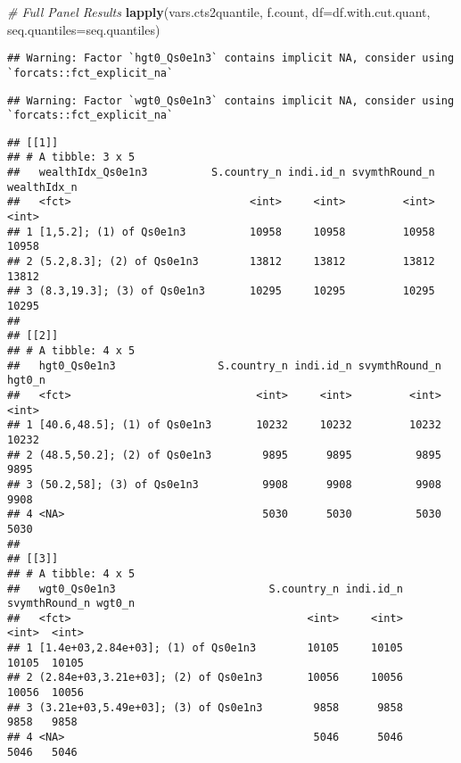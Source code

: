 \documentclass[
]{article}
\newenvironment{Shaded}{\begin{snugshade}}{\end{snugshade}}
\newcommand{\CommentTok}[1]{\textcolor[rgb]{0.56,0.35,0.01}{\textit{#1}}}
\newcommand{\DataTypeTok}[1]{\textcolor[rgb]{0.13,0.29,0.53}{#1}}
\newcommand{\KeywordTok}[1]{\textcolor[rgb]{0.13,0.29,0.53}{\textbf{#1}}}
\newcommand{\NormalTok}[1]{#1}
\begin{document}
\begin{Shaded}
\begin{Highlighting}[]
\CommentTok{# Full Panel Results}
\KeywordTok{lapply}\NormalTok{(vars.cts2quantile, f.count, }
       \DataTypeTok{df=}\NormalTok{df.with.cut.quant, }\DataTypeTok{seq.quantiles=}\NormalTok{seq.quantiles)}
\end{Highlighting}
\end{Shaded}

\begin{verbatim}
## Warning: Factor `hgt0_Qs0e1n3` contains implicit NA, consider using `forcats::fct_explicit_na`
\end{verbatim}

\begin{verbatim}
## Warning: Factor `wgt0_Qs0e1n3` contains implicit NA, consider using `forcats::fct_explicit_na`
\end{verbatim}

\begin{verbatim}
## [[1]]
## # A tibble: 3 x 5
##   wealthIdx_Qs0e1n3          S.country_n indi.id_n svymthRound_n wealthIdx_n
##   <fct>                            <int>     <int>         <int>       <int>
## 1 [1,5.2]; (1) of Qs0e1n3          10958     10958         10958       10958
## 2 (5.2,8.3]; (2) of Qs0e1n3        13812     13812         13812       13812
## 3 (8.3,19.3]; (3) of Qs0e1n3       10295     10295         10295       10295
## 
## [[2]]
## # A tibble: 4 x 5
##   hgt0_Qs0e1n3                S.country_n indi.id_n svymthRound_n hgt0_n
##   <fct>                             <int>     <int>         <int>  <int>
## 1 [40.6,48.5]; (1) of Qs0e1n3       10232     10232         10232  10232
## 2 (48.5,50.2]; (2) of Qs0e1n3        9895      9895          9895   9895
## 3 (50.2,58]; (3) of Qs0e1n3          9908      9908          9908   9908
## 4 <NA>                               5030      5030          5030   5030
## 
## [[3]]
## # A tibble: 4 x 5
##   wgt0_Qs0e1n3                        S.country_n indi.id_n svymthRound_n wgt0_n
##   <fct>                                     <int>     <int>         <int>  <int>
## 1 [1.4e+03,2.84e+03]; (1) of Qs0e1n3        10105     10105         10105  10105
## 2 (2.84e+03,3.21e+03]; (2) of Qs0e1n3       10056     10056         10056  10056
## 3 (3.21e+03,5.49e+03]; (3) of Qs0e1n3        9858      9858          9858   9858
## 4 <NA>                                       5046      5046          5046   5046
\end{verbatim}
\end{document}
